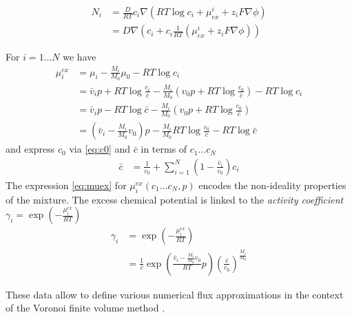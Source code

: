 \documentclass[12pt,oneside,reqno]{amsart}
\numberwithin{equation}{section}
\begin{document}
\begin{align}
  N_i &= \frac{D}{RT} c_i \nabla\left( RT \log c_i  +  \mu^i_{ex} +z_iF\nabla\phi\right) \nonumber\\
      &= D\nabla\left(c_i  +  c_i\frac{1}{RT}(\mu^i_{ex} +z_iF\nabla\phi)\right) \label{eq:flux}
\end{align}

For $i=1\dots N$ we have
\begin{align}
  \mu_i^{ex} &= \mu_i - \frac{M_i}{M_0} \mu_0  - RT \log c_i\nonumber\\
             &= \bar v_ip +  RT \log \frac{c_i}{\bar c}  -\frac{M_i}{M_0}\left(  v_0p + RT \log \frac{c_0}{\bar c}\right)  - RT \log c_i  \nonumber\\
            &= \bar v_ip - RT\log \bar c - \frac{M_i}{M_0}\left(v_0p + RT \log \frac{c_0}{\bar c}\right)\nonumber\\
            &= \left(\bar v_i-\frac{M_i}{M_0}v_0\right)p - \frac{M_i}{M_0}RT\log \frac{c_0}{\bar c} - RT\log \bar c \label{eq:muex}
\end{align}
and express $c_0$ via \eqref{eq:c0} and $\bar c$ in terms of $c_1\dots c_N$
\begin{align*}
  \bar c &%
          = \frac{1}{v_0} + \sum_{i=1}^N \left(1- \frac{\bar v_i}{v_0}\right) c_i 
\end{align*}
The expression \eqref{eq:muex} for $\mu_i^{ex}(c_1\dots c_N, p)$  encodes the non-ideality properties of the mixture.
The excess chemical potential is linked to the \textit{activity coefficient} $\gamma_i=\exp(-\frac{\mu_i^{ex}}{RT})$
\cite{Fuhrmann2015}
\begin{align*}
  \gamma_i&=\exp(-\frac{\mu_i^{ex}}{RT})\\
         &= \frac{1}{\bar c}\exp\left(\frac{\bar v_i-\frac{M_i}{M_0}v_0}{RT}p\right)\left(\frac{\bar c}{c_0}\right)^{\frac{M_i}{M_0}}
\end{align*}




These data allow to define various numerical flux approximations in the context of the Voronoi finite volume
method \cite{Fuhrmann2015,GaudeulFuhrmannNM2022}.
\end{document}
